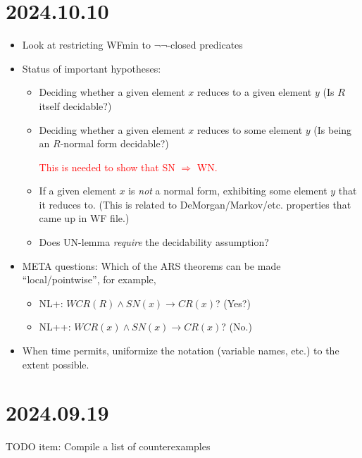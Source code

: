 \documentclass{scrartcl}
\begin{document}
\section{2024.10.10}

\begin{itemize}
  \item Look at restricting WFmin to $\lnot\lnot$-closed predicates
  \item Status of important hypotheses:
    \begin{itemize}
      \item Deciding whether a given element $x$ reduces to a given element $y$
      (Is $R$ itself decidable?)
      \item Deciding whether a given element $x$ reduces to some element $y$
      (Is being an $R$-normal form decidable?)

      {\textcolor{red}{This is needed to show that SN $\Rightarrow$ WN.}}

      \item If a given element $x$ is \emph{not} a normal form,
      exhibiting some element $y$ that it reduces to.
      (This is related to DeMorgan/Markov/etc. properties that came up in WF file.)

      \item Does UN-lemma \emph{require} the decidability assumption?
    \end{itemize}
  \item META questions: Which of the ARS theorems can be made ``local/pointwise'',
  for example,
  \begin{itemize}
    \item NL+: $WCR(R) \land SN(x) \to CR(x)$?  (Yes?)
    \item NL++: $WCR(x) \land SN(x) \to CR(x)$? (No.)
  \end{itemize}
  \item When time permits, uniformize the notation (variable names, etc.) to the extent possible.
\end{itemize}

\section{2024.09.19}

TODO item: Compile a list of counterexamples
\end{document}

